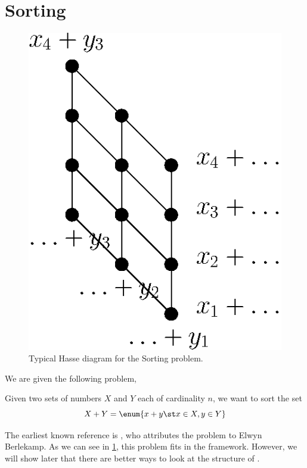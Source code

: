 

\section{Sorting \XY}
\label{tree:related:xy}

\begin{figure}
	\centering
	\includegraphics[height=0.2\textheight]{fig/related/x+y}
	\caption{Typical Hasse diagram for the Sorting \XY problem.}
	\label{fig:related:xy}
\end{figure}

We are given the following problem,

\begin{problem}
Given two sets of numbers \(X\) and \(Y\) each of cardinality \(n\), we want to
sort the set
\begin{displaymath}
X + Y = \enum{x + y \st x \in X, y \in Y}
\end{displaymath}
\end{problem}

The earliest known reference is \citet*{fredman:1976}, who attributes
the problem to Elwyn Berlekamp. As we can see in \ref{fig:related:xy}, this
problem fits in the  framework. However, we will show later that
there are better ways to look at the structure of \XY.

